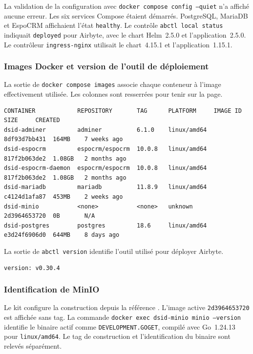 \documentclass[11pt,a4paper]{article}
\newcommand{\code}[1]{\texttt{#1}}
\begin{document}
La validation de la configuration avec \code{docker compose config --quiet}
n'a affiché aucune erreur. Les six services Compose étaient démarrés.
PostgreSQL, MariaDB et EspoCRM affichaient l'état \code{healthy}.
Le contrôle \code{abctl local status} indiquait \code{deployed} pour
Airbyte, avec le chart Helm~2.5.0 et l'application~2.5.0.
Le contrôleur \code{ingress-nginx} utilisait le chart~4.15.1 et
l'application~1.15.1.

\subsubsection{Images Docker et version de l'outil de déploiement}

La sortie de \code{docker compose images} associe chaque conteneur
à l'image effectivement utilisée. Les colonnes sont resserrées
pour tenir sur la page.

\begin{Verbatim}[fontsize=\scriptsize]
CONTAINER            REPOSITORY       TAG      PLATFORM     IMAGE ID      SIZE     CREATED
dsid-adminer         adminer          6.1.0    linux/amd64  8df93d7bb431  164MB    7 weeks ago
dsid-espocrm         espocrm/espocrm  10.0.8   linux/amd64  817f2b063de2  1.08GB   2 months ago
dsid-espocrm-daemon  espocrm/espocrm  10.0.8   linux/amd64  817f2b063de2  1.08GB   2 months ago
dsid-mariadb         mariadb          11.8.9   linux/amd64  c4124d1afa87  453MB    2 weeks ago
dsid-minio           <none>           <none>   unknown      2d3964653720  0B       N/A
dsid-postgres        postgres         18.6     linux/amd64  e3d24f6906d0  644MB    8 days ago
\end{Verbatim}

La sortie de \code{abctl version} identifie l'outil utilisé pour
déployer Airbyte.

\begin{Verbatim}[fontsize=\small]
version: v0.30.4
\end{Verbatim}

\subsubsection{Identification de MinIO}

Le kit configure la construction depuis la référence
. L'image active \code{2d3964653720}
est affichée sans tag. La commande \code{docker exec dsid-minio minio --version}
identifie le binaire actif comme \code{DEVELOPMENT.GOGET}, compilé avec
Go~1.24.13 pour \code{linux/amd64}. Le tag de construction et
l'identification du binaire sont relevés séparément.
\end{document}
